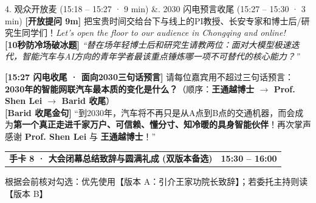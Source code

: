 \documentclass[12pt,a4paper]{article}
\makeatletter
\newcommand{\cardbanner}[3]{%
  \begin{tcolorbox}[
    enhanced, colback=nusnavy, colframe=nusnavy, arc=1.8mm,
    boxrule=0pt, left=3.8mm, right=3.8mm, top=2.1mm, bottom=2.2mm,
    before skip=0pt, after skip=2.4mm,
    borderline south={1.1mm}{0mm}{nusorange}
  ]
    \begin{tabularx}{\linewidth}{@{}X r@{}}
      {\fontsize{13.2}{16}\selectfont\color{white}\textbf{#1}} &
      {\fontsize{11.2}{14}\selectfont\color{orangebg}\textbf{#2}}
    \end{tabularx}
    \vspace{0.6mm}
    {\fontsize{9.3}{11.8}\selectfont\color{slate200}#3}
  \end{tcolorbox}
}
\makeatother
\begin{document}
\begin{transbox}{4. 观众开放麦 (15:18 – 15:27 · 9 min) \;\&. 2030 闪电预言收尾 (15:27 – 15:30 · 3 min)}
\fontsize{10.4}{14.7}\selectfont
\textbf{[开放提问 9m]} 把宝贵时间交给台下与线上的PI教授、长安专家和博士后/研究生同学们！\textit{Let's open the floor to our audience in Chongqing and online!}\\
\textbf{[10秒防冷场破冰题]} \textit{“替在场年轻博士后和研究生请教两位：面对大模型极速迭代，智能汽车与AI方向的青年学者最该重点锤炼哪一项不可替代的核心能力？”}\par
\vspace{0.8mm}
\textbf{[15:27 闪电收尾 · 面向2030三句话预言]} 请每位嘉宾用不超过三句话预言：\textbf{2030年的智能网联汽车最本质的变化是什么？}（顺序：\textbf{王通越博士 $\rightarrow$ Prof. Shen Lei $\rightarrow$ Barid 收尾}）\\
\textbf{[Barid 收尾金句]} “到2030年，汽车将不再只是从A点到B点的交通机器，而会成为\textbf{第一个真正走进千家万户、可信赖、懂分寸、知冷暖的具身智能伙伴}！再次掌声感谢 \textbf{Prof. Shen Lei} 与 \textbf{王通越博士}！”
\end{transbox}

\newpage

\cardbanner{手卡 8 · 大会闭幕总结致辞与圆满礼成 (双版本备选)}{15:30 – 16:00}{根据会前核对勾选：优先使用【版本 A：引介王家功院长致辞】；若委托主持则读【版本 B】}
\end{document}
